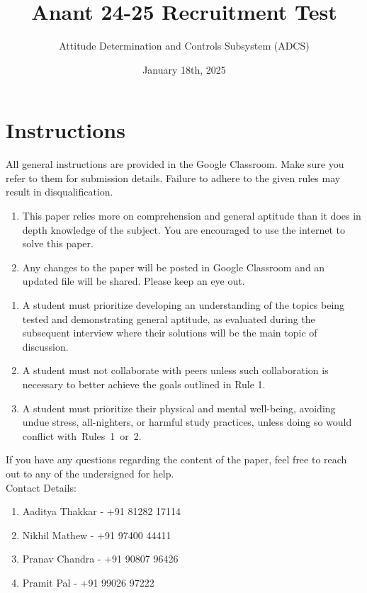 \documentclass[a4paper, 12pt]{exam}
\begin{document}
	\title{Anant 24-25 Recruitment Test}
	\author{Attitude Determination and Controls Subsystem (ADCS)}
	\date{January 18th, 2025}
	\maketitle
	
	\section*{Instructions}
	All general instructions are provided in the Google Classroom. Make sure you refer to them for submission details. Failure to adhere to the given rules may result in disqualification. 
	\begin{enumerate}[]
		\item This paper relies more on comprehension and general aptitude than it does in depth knowledge of the subject. You are encouraged to use the internet to solve this paper.
		\item Any changes to the paper will be posted in Google Classroom and an updated file will be shared. Please keep an eye out.
	\end{enumerate} 
	
	\bigskip

	\begin{enumerate}[label = \textbf{Rule \arabic* }:, leftmargin=5em]
		\item A student must prioritize developing an understanding of the topics being tested and demonstrating general aptitude, as evaluated during the subsequent interview where their solutions will be the main topic of discussion.
		
		\item A student must not collaborate with peers unless such collaboration is necessary to better achieve the goals outlined in Rule 1.
		
		\item A student must prioritize their physical and mental well-being, avoiding undue stress, all-nighters, or harmful study practices, unless doing so would conflict with Rules 1 or 2.
		
			\end{enumerate}
		
If you have any questions regarding the content of the paper, feel free to reach out to any of the undersigned for help. \\

Contact Details:
		\begin{enumerate}
			\item Aaditya Thakkar - +91 81282 17114
			\item Nikhil Mathew - +91 97400 44411
			\item Pranav Chandra - +91 90807 96426
			\item Pramit Pal - +91 99026 97222
		\end{enumerate}
\end{document}
